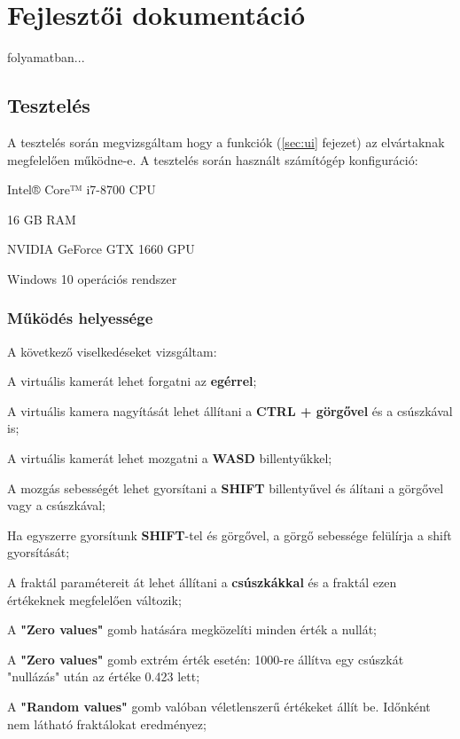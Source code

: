 \chapter{Fejlesztői dokumentáció} 
\label{ch:impl}

folyamatban...

\section{Tesztelés}

A tesztelés során megvizsgáltam hogy a funkciók (\ref{sec:ui} fejezet) az elvártaknak megfelelően működne-e. A tesztelés során használt számítógép konfiguráció:
\begin{compactitem}
	\item Intel® Core™ i7-8700 CPU
	\item 16 GB RAM
	\item NVIDIA GeForce GTX 1660 GPU
	\item Windows 10 operációs rendszer
\end{compactitem}

\subsection{Működés helyessége}

A következő viselkedéseket vizsgáltam:
\begin{compactenum}
	\item A virtuális kamerát lehet forgatni az \textbf{egérrel};
	\item A virtuális kamera nagyítását lehet állítani a \textbf{CTRL + görgővel} és a csúszkával is;
	\item A virtuális kamerát lehet mozgatni a \textbf{WASD} billentyűkkel;
	\item A mozgás sebességét lehet gyorsítani a \textbf{SHIFT} billentyűvel és álítani a görgővel vagy a csúszkával;
	\item Ha egyszerre gyorsítunk \textbf{SHIFT}-tel és görgővel, a görgő sebessége felülírja a shift gyorsítását;
	\item A fraktál paramétereit át lehet állítani a \textbf{csúszkákkal} és a fraktál ezen értékeknek megfelelően változik;
	\item A \textbf{"Zero values"} gomb hatására megközelíti minden érték a nullát;
	\item A \textbf{"Zero values"} gomb extrém érték esetén: 1000-re állítva egy csúszkát "nullázás" után az értéke 0.423 lett;
	\item A \textbf{"Random values"} gomb valóban véletlenszerű értékeket állít be. Időnként nem látható fraktálokat eredményez;
\end{compactenum}

